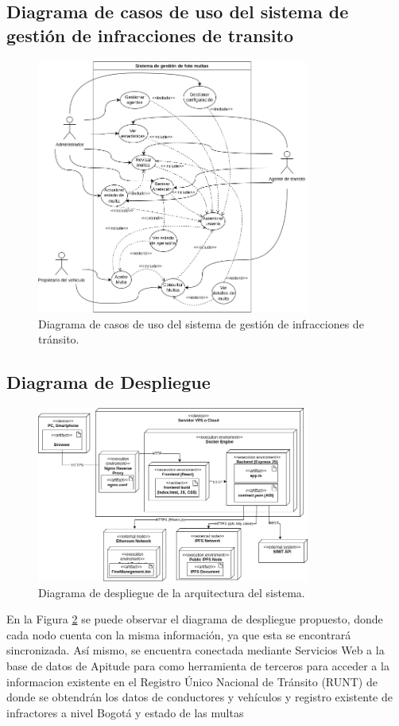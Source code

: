 \documentclass[
    letterpaper, 
    man,   
    spanish,
    12pt,
    donotrepeattitle,
    floatsintext,
    hidelinks %
]{apa7}
\begin{document}
\subsection{Diagrama de casos de uso del sistema de gestión de infracciones de transito }
\begin{figure}[htbp]
    \centering
    \includegraphics[width=0.8\textwidth]{Images/CasosUso.png}
    \caption{Diagrama de casos de uso del sistema de gestión de infracciones de tránsito.}
    \label{fig:casos_uso}
\end{figure}

 \subsection{ Diagrama de Despliegue }
\begin{figure}[htbp]
    \centering
    \includegraphics[width=0.8\textwidth]{Images/Despliegue.png}
    \caption{Diagrama de despliegue de la arquitectura del sistema.}
    \label{fig:diagrama_despliegue}
\end{figure}
En la Figura \ref{fig:diagrama_despliegue} se puede observar el diagrama de despliegue propuesto, donde cada nodo cuenta con la misma información, ya que esta se encontrará sincronizada. Así mismo, se encuentra conectada mediante Servicios Web a la base de datos de Apitude para como herramienta de terceros para acceder a la informacion existente en el Registro Único Nacional de Tránsito (RUNT) de donde se obtendrán los datos de conductores y vehículos y registro existente de infractores a nivel Bogotá y estado de las multas 
\end{document}
